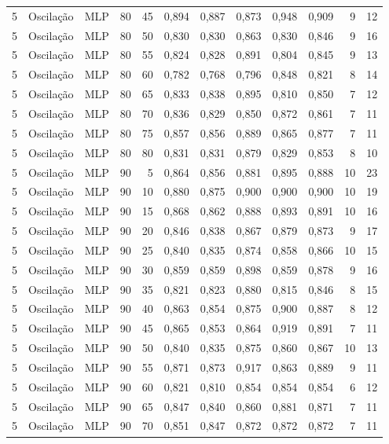 \begin{longtable}{@{}rllrrrrrrrrr@{}}
5 & Oscilação & MLP & 80 & 45 & 0,894 & 0,887 & 0,873 & 0,948 & 0,909 & 9 & 12 \\
5 & Oscilação & MLP & 80 & 50 & 0,830 & 0,830 & 0,863 & 0,830 & 0,846 & 9 & 16 \\
5 & Oscilação & MLP & 80 & 55 & 0,824 & 0,828 & 0,891 & 0,804 & 0,845 & 9 & 13 \\
5 & Oscilação & MLP & 80 & 60 & 0,782 & 0,768 & 0,796 & 0,848 & 0,821 & 8 & 14 \\
5 & Oscilação & MLP & 80 & 65 & 0,833 & 0,838 & 0,895 & 0,810 & 0,850 & 7 & 12 \\
5 & Oscilação & MLP & 80 & 70 & 0,836 & 0,829 & 0,850 & 0,872 & 0,861 & 7 & 11 \\
5 & Oscilação & MLP & 80 & 75 & 0,857 & 0,856 & 0,889 & 0,865 & 0,877 & 7 & 11 \\
5 & Oscilação & MLP & 80 & 80 & 0,831 & 0,831 & 0,879 & 0,829 & 0,853 & 8 & 10 \\
5 & Oscilação & MLP & 90 & 5 & 0,864 & 0,856 & 0,881 & 0,895 & 0,888 & 10 & 23 \\
5 & Oscilação & MLP & 90 & 10 & 0,880 & 0,875 & 0,900 & 0,900 & 0,900 & 10 & 19 \\
5 & Oscilação & MLP & 90 & 15 & 0,868 & 0,862 & 0,888 & 0,893 & 0,891 & 10 & 16 \\
5 & Oscilação & MLP & 90 & 20 & 0,846 & 0,838 & 0,867 & 0,879 & 0,873 & 9 & 17 \\
5 & Oscilação & MLP & 90 & 25 & 0,840 & 0,835 & 0,874 & 0,858 & 0,866 & 10 & 15 \\
5 & Oscilação & MLP & 90 & 30 & 0,859 & 0,859 & 0,898 & 0,859 & 0,878 & 9 & 16 \\
5 & Oscilação & MLP & 90 & 35 & 0,821 & 0,823 & 0,880 & 0,815 & 0,846 & 8 & 15 \\
5 & Oscilação & MLP & 90 & 40 & 0,863 & 0,854 & 0,875 & 0,900 & 0,887 & 8 & 12 \\
5 & Oscilação & MLP & 90 & 45 & 0,865 & 0,853 & 0,864 & 0,919 & 0,891 & 7 & 11 \\
5 & Oscilação & MLP & 90 & 50 & 0,840 & 0,835 & 0,875 & 0,860 & 0,867 & 10 & 13 \\
5 & Oscilação & MLP & 90 & 55 & 0,871 & 0,873 & 0,917 & 0,863 & 0,889 & 9 & 11 \\
5 & Oscilação & MLP & 90 & 60 & 0,821 & 0,810 & 0,854 & 0,854 & 0,854 & 6 & 12 \\
5 & Oscilação & MLP & 90 & 65 & 0,847 & 0,840 & 0,860 & 0,881 & 0,871 & 7 & 11 \\
5 & Oscilação & MLP & 90 & 70 & 0,851 & 0,847 & 0,872 & 0,872 & 0,872 & 7 & 11 \\

\end{longtable}

